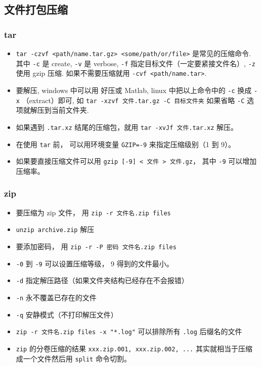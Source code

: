 \subsection{文件打包压缩}
\subsubsection{tar}
\begin{itemize}
\item \verb`tar -czvf <path/name.tar.gz> <some/path/or/file>` 是常见的压缩命令. 其中 \verb`-c` 是 create, \verb`-v` 是 verbose, \verb`-f` 指定目标文件（一定要紧接文件名）, \verb`-z` 使用 gzip 压缩. 如果不需要压缩就用 \verb`-cvf <path/name.tar>`.
\item 要解压, windows 中可以用 好压或 Matlab, linux 中把以上命令中的 \verb`-c` 换成 \verb`-x` （extract）即可, 如 \verb`tar -xzvf 文件.tar.gz -C 目标文件夹` 如果省略 \verb`-C` 选项就解压到当前文件夹.
\item 如果遇到 \verb`.tar.xz` 结尾的压缩包，就用 \verb`tar -xvJf 文件.tar.xz` 解压。
\item 在使用 \verb`tar` 前， 可以用环境变量 \verb`GZIP=-9` 来指定压缩级别（1 到 9）。
\item 如果要直接压缩文件可以用 \verb`gzip [-9] < 文件 > 文件.gz`， 其中 \verb`-9` 可以增加压缩率。
\end{itemize}

\subsubsection{zip}
\begin{itemize}
\item 要压缩为 zip 文件， 用 \verb`zip -r 文件名.zip files`
\item \verb`unzip archive.zip` 解压
\item 要添加密码， 用 \verb`zip -r -P 密码 文件名.zip files`
\item \verb`-0` 到 \verb`-9` 可以设置压缩等级， 9 得到的文件最小。
\item \verb`-d` 指定解压路径（如果文件夹结构已经存在不会报错）
\item \verb`-n` 永不覆盖已存在的文件
\item \verb`-q` 安静模式（不打印解压文件）
\item \verb`zip -r 文件名.zip files -x "*.log"` 可以排除所有 \verb`.log` 后缀名的文件
\item \verb`zip` 的分卷压缩的结果 \verb`xxx.zip.001, xxx.zip.002, ...` 其实就相当于压缩成一个文件然后用 \verb`split` 命令切割。
\end{itemize}

